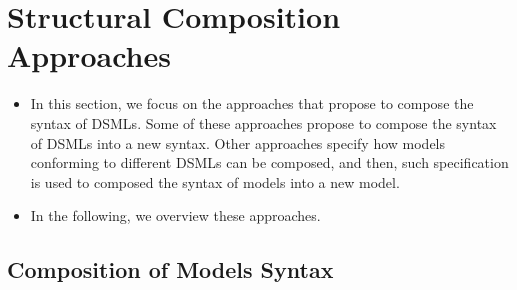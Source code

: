 \section{Structural Composition Approaches}
	\begin{itemize}
		\item In this section, we focus on the approaches that propose to compose the syntax of DSMLs. Some of these approaches propose to compose the syntax of DSMLs into a new syntax. Other approaches specify how models conforming to different DSMLs can be composed, and then, such specification is used to composed the syntax of models into a new model. 
		\item In the following, we overview these approaches. 	
	\end{itemize}    	
 \subsection{Composition of Models Syntax}
